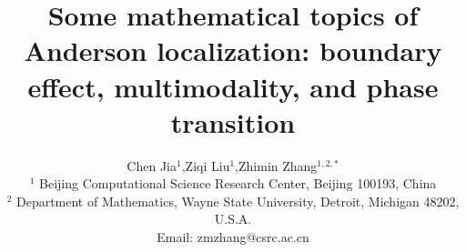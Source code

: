 \documentclass[a4paper,11pt]{article}
\newcommand{\paperfont}{\fontsize{11pt}{1.2\baselineskip}\selectfont}
\begin{document}
	
\theoremstyle{definition}
\makeatletter
\thm@headfont{\bf}
\makeatother
\newtheorem{theorem}{Theorem}[section]
\newtheorem{definition}[theorem]{Definition}
\newtheorem{lemma}[theorem]{Lemma}
\newtheorem{proposition}[theorem]{Proposition}
\newtheorem{corollary}[theorem]{Corollary}
\newtheorem{remark}[theorem]{Remark}
\newtheorem{example}[theorem]{Example}
\newtheorem{assumption}[theorem]{Assumption}

\lhead{}
\rhead{}
\lfoot{}
\rfoot{}

\renewcommand{\refname}{References}
\renewcommand{\figurename}{Figure}
\renewcommand{\tablename}{Table}
\renewcommand{\proofname}{Proof}

\newcommand{\diag}{\mathrm{diag}}
\newcommand{\tr}{\mathrm{tr}}
\newcommand{\Enum}{\mathbb{E}}
\newcommand{\Pnum}{\mathbb{P}}
\newcommand{\Rnum}{\mathbb{R}}
\newcommand{\Cnum}{\mathbb{C}}
\newcommand{\Znum}{\mathbb{Z}}
\newcommand{\Nnum}{\mathbb{N}}
\newcommand{\abs}[1]{\left\vert#1\right\vert}
\newcommand{\set}[1]{\left\{#1\right\}}
\newcommand{\norm}[1]{\left\Vert#1\right\Vert}
\newcommand{\bx}{\mathbf{x}}

\title{\textbf{Some mathematical topics of Anderson localization: boundary effect, multimodality, and phase transition}}
\author{Chen Jia$^{1}$,\;\;\;Ziqi Liu$^{1}$,\;\;\;Zhimin Zhang$^{1,2,*}$\\
\footnotesize $^1$ Beijing Computational Science Research Center, Beijing 100193, China \\
\footnotesize $^2$ Department of Mathematics, Wayne State University, Detroit, Michigan 48202, U.S.A.\\
\footnotesize Email: zmzhang@csrc.ac.cn}
\date{}
\maketitle
\thispagestyle{empty}

\paperfont
\end{document}
